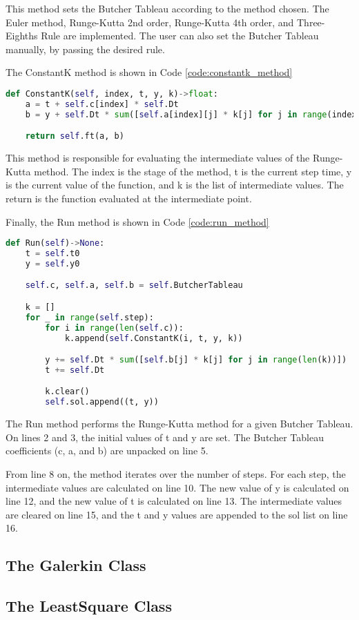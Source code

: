 This method sets the Butcher Tableau according to the method chosen. The Euler method, Runge-Kutta 2nd order, Runge-Kutta 4th order, and Three-Eighths Rule are implemented. The user can also set the Butcher Tableau manually, by passing the desired rule. 

The ConstantK method is shown in Code \ref{code:constantk_method}
\begin{lstlisting}[caption={ConstantK method},label={code:constantk_method},language=python]
def ConstantK(self, index, t, y, k)->float:
    a = t + self.c[index] * self.Dt
    b = y + self.Dt * sum([self.a[index][j] * k[j] for j in range(index)])

    return self.ft(a, b)
\end{lstlisting}

This method is responsible for evaluating the intermediate values of the Runge-Kutta method. The index is the stage of the method, t is the current step time, y is the current value of the function, and k is the list of intermediate values. The return is the function evaluated at the intermediate point.

Finally, the Run method is shown in Code \ref{code:run_method}
\begin{lstlisting}[caption={Run method},label={code:run_method},language=python]
def Run(self)->None:
    t = self.t0
    y = self.y0

    self.c, self.a, self.b = self.ButcherTableau

    k = []
    for _ in range(self.step):
        for i in range(len(self.c)):
            k.append(self.ConstantK(i, t, y, k))

        y += self.Dt * sum([self.b[j] * k[j] for j in range(len(k))])
        t += self.Dt

        k.clear()
        self.sol.append((t, y))
\end{lstlisting}

The Run method performs the Runge-Kutta method for a given Butcher Tableau. On lines 2 and 3, the initial values of t and y are set. The Butcher Tableau coefficients (c, a, and b) are unpacked on line 5. 

From line 8 on, the method iterates over the number of steps. For each step, the intermediate values are calculated on line 10. The new value of y is calculated on line 12, and the new value of t is calculated on line 13. The intermediate values are cleared on line 15, and the t and y values are appended to the sol list on line 16.

\subsection{The Galerkin Class}\label{subsec:galerkin_class}

\subsection{The LeastSquare Class}\label{subsec:leastsquares_class}